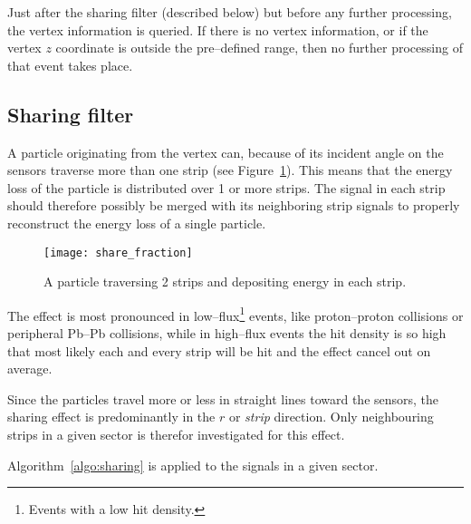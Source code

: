 \documentclass[11pt]{article}
\def\AlwaysText#1{\ifmmode\relax\text{#1}\else #1\fi}
\newcommand{\AbbrName}[1]{\AlwaysText{{\scshape #1}}}
\newcommand{\FMD}[1][]{\AbbrName{fmd\ifx|#1|\else#1\fi}}
\newcommand{\figref}[1]{Figure~\ref{#1}}
\begin{document}
Just after the sharing filter (described below) but before any further
processing, the vertex information is queried.  If there is no vertex
information, or if the vertex $z$ coordinate is outside the
pre--defined range, then no further processing of that event takes place. 

\subsection{Sharing filter}
\label{sec:sub:sharing_filter}

A particle originating from the vertex can, because of its incident
angle on the \FMD{} sensors traverse more than one strip (see
\figref{fig:share_fraction}).  This means that the energy loss of the
particle is distributed over 1 or more strips.  The signal in each
strip should therefore possibly be merged with its neighboring strip
signals to properly reconstruct the energy loss of a single particle.

\begin{figure}[htbp]
  \centering
  \texttt{[image: share\_fraction]}
  \caption{A particle traversing 2 strips and depositing energy in
    each strip. }
  \label{fig:share_fraction}
\end{figure}

The effect is most pronounced in low--flux\footnote{Events with a low
  hit density.} events, like proton--proton collisions or peripheral
Pb--Pb collisions, while in high--flux events the hit density is so
high that most likely each and every strip will be hit and the effect
cancel out on average.

Since the particles travel more or less in straight lines toward the
\FMD{} sensors, the sharing effect is predominantly in the $r$ or
\emph{strip} direction.  Only neighbouring strips in a given sector is
therefor investigated for this effect.  

Algorithm~\ref{algo:sharing} is applied to the signals in a given
sector.
\end{document}
